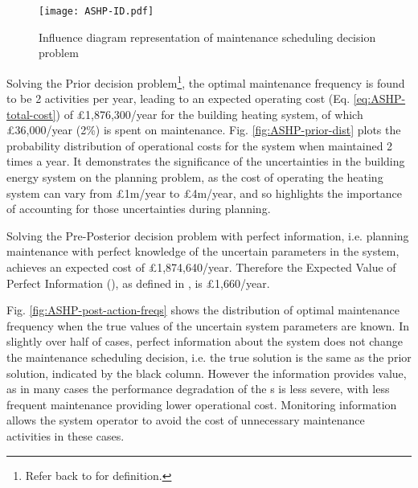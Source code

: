 \begin{figure}[h]
    \centering
    \texttt{[image: ASHP-ID.pdf]}
    \vspace{2pt}
    \caption{Influence diagram representation of  maintenance scheduling decision problem}
    \label{fig:ID-ASHP-maintenance}
\end{figure}

\newpage
Solving the Prior decision problem\footnote{\label{fn:pdp-defn} Refer back to  for definition.}, the optimal maintenance frequency is found to be 2 activities per year, leading to an expected operating cost (Eq. \ref{eq:ASHP-total-cost}) of £1,876,300/year for the building heating system, of which £36,000/year (2\%) is spent on maintenance. Fig. \ref{fig:ASHP-prior-dist} plots the probability distribution of operational costs for the system when maintained 2 times a year. It demonstrates the significance of the uncertainties in the building energy system on the planning problem, as the cost of operating the heating system can vary from £1m/year to £4m/year, and so highlights the importance of accounting for those uncertainties during planning.

Solving the Pre-Posterior decision problem with perfect information, i.e. planning maintenance with perfect knowledge of the uncertain parameters in the system, achieves an expected cost of £1,874,640/year. Therefore the Expected Value of Perfect Information (), as defined in , is £1,660/year.

Fig. \ref{fig:ASHP-post-action-freqs} shows the distribution of optimal maintenance frequency when the true values of the uncertain system parameters are known. In slightly over half of cases, perfect information about the system does not change the maintenance scheduling decision, i.e. the true solution is the same as the prior solution, indicated by the black column. However the information provides value, as in many cases the performance degradation of the s is less severe, with less frequent maintenance providing lower operational cost. Monitoring information allows the system operator to avoid the cost of unnecessary maintenance activities in these cases.\\

